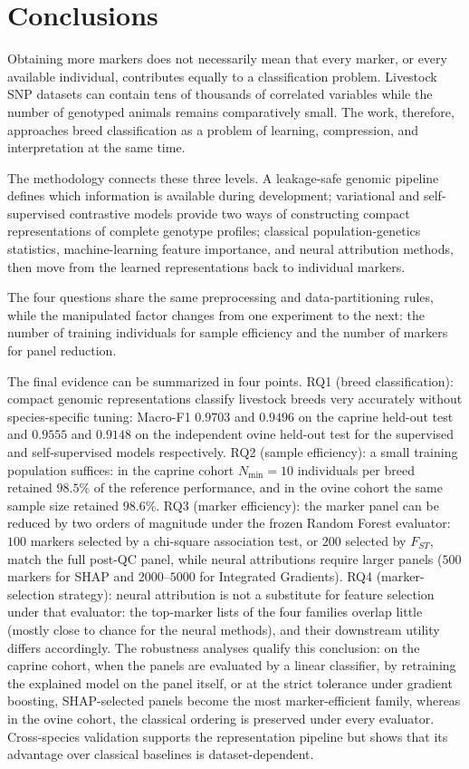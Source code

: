 \chapter{Conclusions}
\label{chap:conclusion}

Obtaining more markers does not necessarily mean that every
marker, or every available individual, contributes equally to a
classification problem. Livestock SNP datasets can contain tens of
thousands of correlated variables while the number of genotyped
animals remains comparatively small. The work, therefore, approaches
breed classification as a problem of learning, compression, and
interpretation at the same time.

The methodology connects these three levels. A leakage-safe genomic
pipeline defines which information is available during development;
variational and self-supervised contrastive models provide two ways of
constructing compact representations of complete genotype profiles;
classical population-genetics statistics, machine-learning feature
importance, and neural attribution methods, then move from the learned
representations back to individual markers.

The four questions share the same preprocessing and data-partitioning
rules, while the manipulated factor changes from one experiment to the
next: the number of training individuals for sample efficiency and the
number of markers for panel reduction.

The final evidence can be summarized in four points. RQ1 (breed
classification): compact genomic representations classify livestock
breeds very accurately without species-specific tuning: Macro-F1
$0.9703$ and $0.9496$ on the caprine held-out test and $0.9555$ and
$0.9148$ on the independent ovine held-out test for the supervised and
self-supervised models respectively. RQ2 (sample efficiency): a
small training population suffices: in the caprine cohort
$N_{\min}=10$ individuals per breed retained $98.5\%$ of the reference
performance, and in the ovine cohort the same sample size retained
$98.6\%$. RQ3 (marker efficiency): the marker panel can be reduced by
two orders of magnitude under the frozen Random Forest evaluator: $100$
markers selected by a chi-square association test, or $200$ selected by
$F_{ST}$, match the full post-QC panel, while neural attributions
require larger panels ($500$ markers for SHAP and $2000$--$5000$ for
Integrated Gradients). RQ4 (marker-selection strategy): neural
attribution is not a substitute for feature selection under that
evaluator: the
top-marker lists of the four families overlap little (mostly close to
chance for the neural methods), and their downstream utility differs
accordingly. The robustness analyses qualify this conclusion: on the caprine
cohort, when the panels are evaluated by a linear classifier, by
retraining the explained model on the panel itself, or at the strict
tolerance under gradient boosting, SHAP-selected panels become the
most marker-efficient family, whereas
in the ovine cohort, the classical ordering is preserved under every
evaluator.
Cross-species validation supports the representation pipeline but
shows that its advantage over classical baselines is
dataset-dependent.

